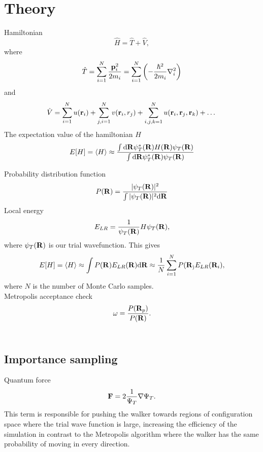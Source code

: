 % 

\section*{Theory}
Hamiltonian
\[
    \hat H = \hat T + \hat V,
\]
where
\[
    \hat T = \sum_{i=1}^N \frac{\mathbf{p}_i^2}{2m_i} = \sum_{i=1}^N \left( -\frac{\hbar^2}{2m_i}\nabla_i^2 \right)
\]
and
\[
    \hat V = \sum_{i=1}^N u(\mathbf{r}_i) + \sum_{j,i=1}^N v(\mathbf{r}_i, r_j) + \sum_{i,j,k=1}^N u(\mathbf{r}_i, \mathbf{r}_j, \mathbf{r}_k) + \dots
\]
The expectation value of the hamiltonian $H$
\[
    E[H] = \langle H \rangle \approx \frac{\int \mathrm{d}\mathbf{R} \psi_T^*(\mathbf{R}) H(\mathbf{R}) \psi_T(\mathbf{R})}{\int \mathrm{d}\mathbf{R} \psi_T^*(\mathbf{R}) \psi_T(\mathbf{R})}
\]

Probability distribution function
\[
P(\mathbf{R}) = \frac{|\psi_T(\mathbf{R})|^2}{\int|\psi_T(\mathbf{R})|^2 \mathrm{d}\mathbf{R}}    
\]
Local energy
\begin{align*}
    E_{LR} = \frac{1}{\psi_T(\mathbf{R})} H \psi_T(\mathbf{R}),
\end{align*}
where $\psi_T(\mathbf{R})$ is our trial wavefunction. This gives
\[
    E[H] = \langle H \rangle \approx \int P(\mathbf{R}) E_{LR} (\mathbf{R}) \mathrm{d}\mathbf{R} \approx \frac{1}{N} \sum_{i=1}^N P(\mathbf{R}_) E_{LR}(\mathbf{R}_i),
\]
where $N$ is the number of Monte Carlo samples.\\

Metropolis acceptance check
\begin{align*}
    \omega = \frac{P(\mathbf{R}_p)}{P(\mathbf{R})}.
\end{align*} \\


\subsection*{Importance sampling}
Quantum force
\[
    \mathbf{F} = 2\frac{1}{\Psi_T}\nabla \Psi_T.
\]
This term is responsible for pushing the walker towards regions of configuration space where the trial wave function is large, increasing the efficiency of the simulation in contrast to the Metropolis algorithm where the walker has the same probability of moving in every direction. \\

